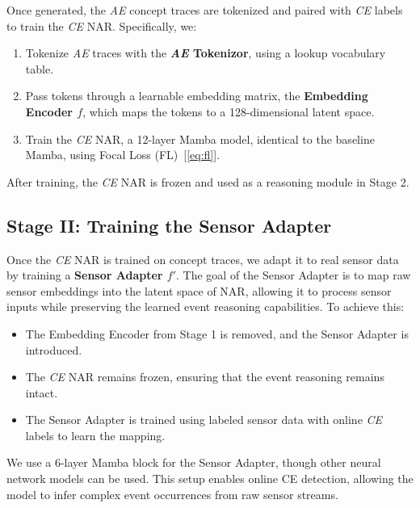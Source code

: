 Once generated, the \emph{AE} concept traces are tokenized and paired with \emph{CE} labels to train the \emph{CE} NAR. Specifically, we:
\begin{enumerate}[leftmargin=1em,nosep]
    \item Tokenize \emph{AE} traces with the \textbf{\emph{AE} Tokenizor}, using a lookup vocabulary table.
    \item Pass tokens through a learnable embedding matrix, the \textbf{Embedding Encoder $f$}, which maps the tokens to a 128-dimensional latent space.
    \item Train the \emph{CE} NAR, a 12-layer Mamba model, identical to the baseline Mamba, using Focal Loss (FL)~[\ref{eq:fl}].
\end{enumerate}

After training, the \emph{CE} NAR is frozen and used as a reasoning module in Stage 2.


\subsection{Stage II: Training the Sensor Adapter}
Once the \emph{CE} NAR is trained on concept traces, we adapt it to real sensor data by training a \textbf{Sensor Adapter $f'$}. The goal of the Sensor Adapter is to map raw sensor embeddings into the latent space of NAR, allowing it to process sensor inputs while preserving the learned event reasoning capabilities.
To achieve this:
\begin{itemize}[leftmargin=1em,nosep]
    \item The Embedding Encoder from Stage 1 is removed, and the Sensor Adapter is introduced.
    \item The \emph{CE} NAR remains frozen, ensuring that the event reasoning remains intact.
    \item The Sensor Adapter is trained using labeled sensor data with online \emph{CE} labels to learn the mapping.
\end{itemize}

We use a 6-layer Mamba block for the Sensor Adapter, though other neural network models can be used. This setup enables online CE detection, allowing the model to infer complex event occurrences from raw sensor streams.



